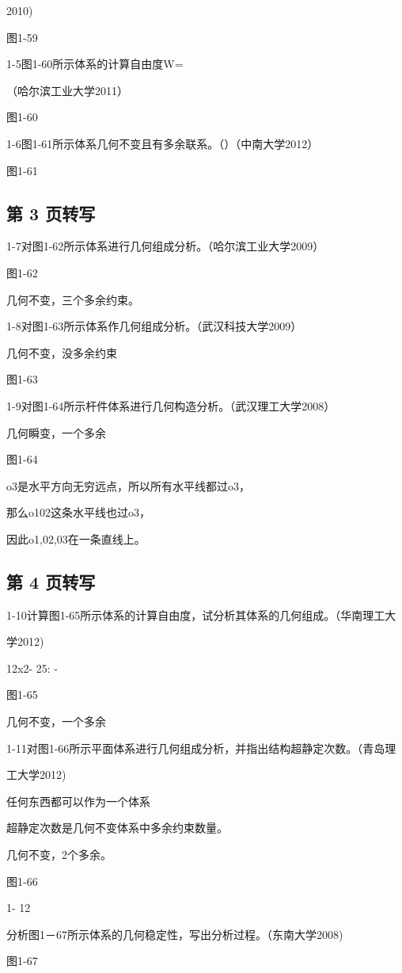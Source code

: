 2010)

图1-59

1-5图1-60所示体系的计算自由度W=

（哈尔滨工业大学2011）

图1-60

1-6图1-61所示体系几何不变且有多余联系。（）（中南大学2012）

图1-61

\subsection*{第 3 页转写}
1-7对图1-62所示体系进行几何组成分析。（哈尔滨工业大学2009）

图1-62

几何不变，三个多余约束。

1-8对图1-63所示体系作几何组成分析。（武汉科技大学2009）

几何不变，没多余约束

图1-63

1-9对图1-64所示杆件体系进行几何构造分析。（武汉理工大学2008）

几何瞬变，一个多余

图1-64

o3是水平方向无穷远点，所以所有水平线都过o3，

那么o102这条水平线也过o3，

因此o1,02,03在一条直线上。

\subsection*{第 4 页转写}
1-10计算图1-65所示体系的计算自由度，试分析其体系的几何组成。（华南理工大

学2012)

12x2- 25: -

图1-65

几何不变，一个多余

1-11对图1-66所示平面体系进行几何组成分析，并指出结构超静定次数。（青岛理

工大学2012)

任何东西都可以作为一个体系

超静定次数是几何不变体系中多余约束数量。

几何不变，2个多余。

图1-66

1- 12

分析图1－67所示体系的几何稳定性，写出分析过程。（东南大学2008)

图1-67

